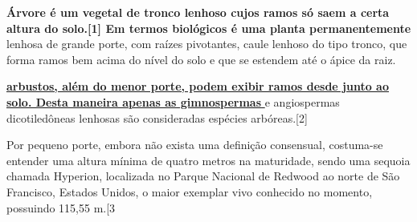 \documentclass[12pt,a4]{article}
\begin{document}
\textbf{Árvore é um vegetal de tronco lenhoso cujos ramos só saem a certa altura do solo.[1] Em termos biológicos é uma planta permanentemente} lenhosa de grande porte, com raízes pivotantes, caule lenhoso do tipo tronco, que forma ramos bem acima do nível do solo e que se estendem até o ápice da raiz.

\begin{center}
\underline{\textbf{ arbustos, além do menor porte, podem exibir ramos desde junto ao solo. Desta maneira apenas as gimnospermas} }e angiospermas dicotiledôneas lenhosas são consideradas espécies arbóreas.[2]
\end{center}
Por pequeno porte, embora não exista uma definição consensual, costuma-se entender uma altura mínima de quatro metros na maturidade, sendo uma sequoia chamada Hyperion, localizada no Parque Nacional de Redwood ao norte de São Francisco, Estados Unidos, o maior exemplar vivo conhecido no momento, possuindo 115,55 m.[3
\end{document}
